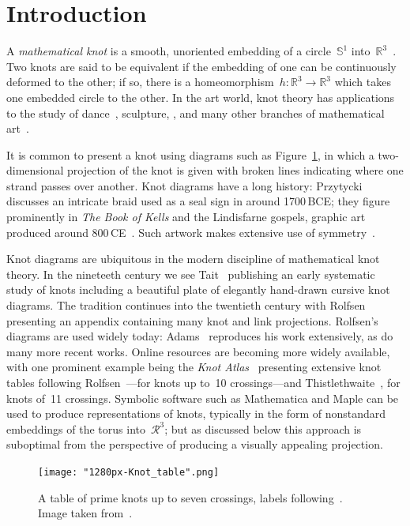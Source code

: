 \documentclass{birkjour}
\theoremstyle{definition}
\theoremstyle{remark}
\numberwithin{equation}{section}
\begin{document}
\section{Introduction}

A {\em mathematical knot} is a smooth, unoriented embedding of a
circle~$\mathbb{S}^1$ into~$\mathbb{R}^3$~\cite{manturov2004,adams2004}.  Two
knots are said to be equivalent if the embedding of one can be
continuously deformed to the other; if so, there is a
homeomorphism~$h\colon\mathbb{R}^3\longrightarrow\mathbb{R}^3$ which
takes one embedded circle to the other.  In the art world, knot theory
has applications to the study of dance~\cite{khorami2020}, sculpture,
\cite{bosch2010, widmark2020}, and many other branches of mathematical
art~\cite{hart2008}.

It is common to present a knot using diagrams such as
Figure~\ref{knot_table}, in which a two-dimensional projection of the
knot is given with broken lines indicating where one strand passes
over another.  Knot diagrams have a long history:
Przytycki~\cite{przytycki1998} discusses an intricate braid used as a
seal sign in around 1700\,BCE; they figure prominently in {\em The
  Book of Kells} and the Lindisfarne gospels, graphic art produced
around 800\,CE~\cite{bain1973}.  Such artwork makes extensive use of
symmetry~\cite{cromwell2008}.

Knot diagrams are ubiquitous in the modern discipline of mathematical
knot theory.  In the nineteeth century we see Tait~\cite{tait1884}
publishing an early systematic study of knots including a beautiful
plate of elegantly hand-drawn cursive knot diagrams.  The tradition
continues into the twentieth century with Rolfsen~\cite{rolfsen1976}
presenting an appendix containing many knot and link projections.
Rolfsen's diagrams are used widely today: Adams~\cite{adams2004}
reproduces his work extensively, as do many more recent works.  Online
resources are becoming more widely available, with one prominent
example being the {\em Knot Atlas}~\cite{knot_atlas} presenting
extensive knot tables following Rolfsen~\cite{rolfsen1976}---for knots
up to~10 crossings---and Thistlethwaite~\cite{hoste1998}, for knots
of~11 crossings.  Symbolic software such as Mathematica and Maple can
be used to produce representations of knots, typically in the form of
nonstandard embeddings of the torus into~$\mathcal{R}^3$; but as
discussed below this approach is suboptimal from the perspective of producing a
visually appealing projection.

\begin{figure}[h]
  \centering
  \texttt{[image: "1280px-Knot\_table".png]}
  \caption{A table of prime knots up \label{knot_table} to seven
    crossings, labels following~\cite{alexander1926}.  Image taken
    from~\cite{wikipedia_knot_theory}.}
\end{figure}
\end{document}
